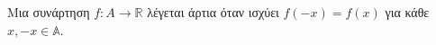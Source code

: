 Μια συνάρτηση $f: A \to \mathbb{R}$ λέγεται άρτια όταν ισχύει $f(-x) = f(x)$ για κάθε $x, -x \in \mathbb{A}$.
